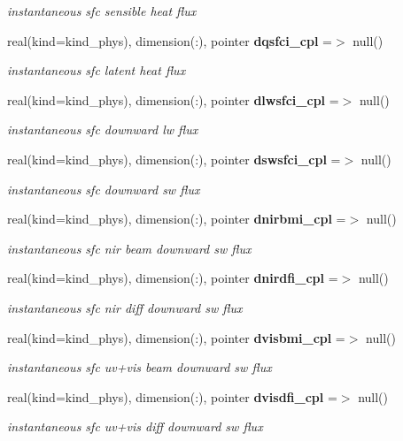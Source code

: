 \begin{DoxyCompactItemize}
\begin{DoxyCompactList}\small\item\em instantaneous sfc sensible heat flux \end{DoxyCompactList}\item 
real(kind=kind\+\_\+phys), dimension(\+:), pointer \textbf{ dqsfci\+\_\+cpl} =$>$ null()
\begin{DoxyCompactList}\small\item\em instantaneous sfc latent heat flux \end{DoxyCompactList}\item 
real(kind=kind\+\_\+phys), dimension(\+:), pointer \textbf{ dlwsfci\+\_\+cpl} =$>$ null()
\begin{DoxyCompactList}\small\item\em instantaneous sfc downward lw flux \end{DoxyCompactList}\item 
real(kind=kind\+\_\+phys), dimension(\+:), pointer \textbf{ dswsfci\+\_\+cpl} =$>$ null()
\begin{DoxyCompactList}\small\item\em instantaneous sfc downward sw flux \end{DoxyCompactList}\item 
real(kind=kind\+\_\+phys), dimension(\+:), pointer \textbf{ dnirbmi\+\_\+cpl} =$>$ null()
\begin{DoxyCompactList}\small\item\em instantaneous sfc nir beam downward sw flux \end{DoxyCompactList}\item 
real(kind=kind\+\_\+phys), dimension(\+:), pointer \textbf{ dnirdfi\+\_\+cpl} =$>$ null()
\begin{DoxyCompactList}\small\item\em instantaneous sfc nir diff downward sw flux \end{DoxyCompactList}\item 
real(kind=kind\+\_\+phys), dimension(\+:), pointer \textbf{ dvisbmi\+\_\+cpl} =$>$ null()
\begin{DoxyCompactList}\small\item\em instantaneous sfc uv+vis beam downward sw flux \end{DoxyCompactList}\item 
real(kind=kind\+\_\+phys), dimension(\+:), pointer \textbf{ dvisdfi\+\_\+cpl} =$>$ null()
\begin{DoxyCompactList}\small\item\em instantaneous sfc uv+vis diff downward sw flux \end{DoxyCompactList}\item 

\end{DoxyCompactItemize}
